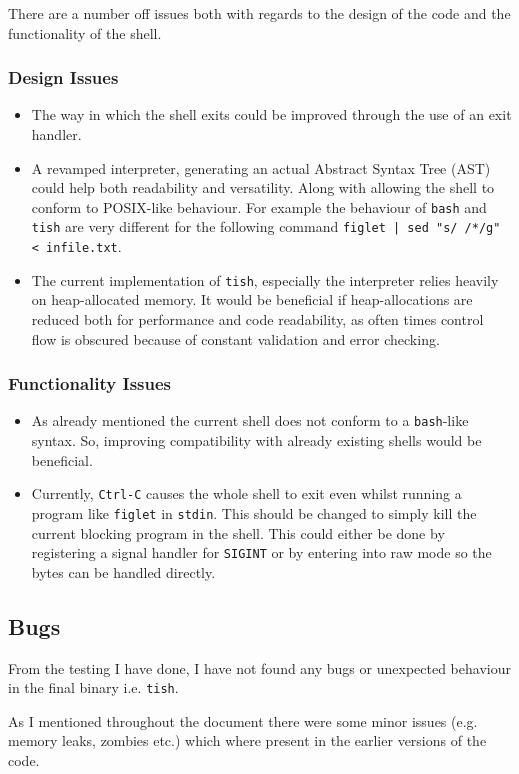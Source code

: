 \documentclass[12pt]{article}
\begin{document}
There are a number off issues both with regards to the design of
the code and the functionality of the shell.

\subsubsection{Design Issues}

\begin{itemize}
\item
  The way in which the shell exits could be improved through the
  use of an exit handler.
\item
  A revamped interpreter, generating an actual Abstract Syntax
  Tree (AST) could help both readability and versatility. Along
  with allowing the shell to conform to POSIX-like behaviour.
  For example the behaviour of \texttt{bash} and \texttt{tish}
  are very different for the following command \texttt{figlet |
  sed "s/ /*/g" < infile.txt}.
\item
  The current implementation of \texttt{tish}, especially the
  interpreter relies heavily on heap-allocated memory. It would
  be beneficial if heap-allocations are reduced both for
  performance and code readability, as often times
  control flow is obscured because of constant validation and
  error checking.
\end{itemize}

\subsubsection{Functionality Issues}

\begin{itemize}
\item
  As already mentioned the current shell does not conform to a
  \texttt{bash}-like syntax. So, improving compatibility with
  already existing shells would be beneficial.
\item
  Currently, \texttt{Ctrl-C} causes the whole shell to exit even
  whilst running a program like \texttt{figlet} in
  \texttt{stdin}. This should be changed to simply kill the
  current blocking program in the shell. This could either be
  done by registering a signal handler for \texttt{SIGINT} or by
  entering into raw mode so the bytes can be handled directly.
\end{itemize}

\subsection{Bugs}

From the testing I have done, I have not found any bugs or
unexpected behaviour in the final binary i.e. \texttt{tish}.

As I mentioned throughout the document there were some minor
issues (e.g. memory leaks, zombies etc.) which where present in
the earlier versions of the code.
\end{document}
